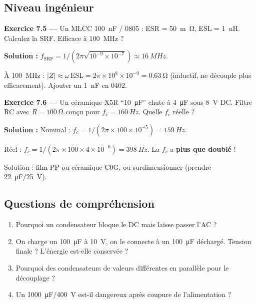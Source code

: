 \documentclass[12pt,a4paper,twoside]{book}
\begin{document}
\subsection*{Niveau ingénieur}

\textbf{Exercice 7.5 ---} Un MLCC \SI{100}{nF} / 0805 : ESR = \SI{50}{m\ohm}, ESL = \SI{1}{nH}. Calculez la SRF. Efficace à \SI{100}{MHz} ?

\begin{pratique}
\textbf{Solution :} $f_{\text{SRF}} = 1/(2\pi\sqrt{10^{-9}\times10^{-7}}) \approx \SI{16}{MHz}$.

À \SI{100}{MHz} : $|Z| \approx \omega\,\text{ESL} = 2\pi\times10^8\times10^{-9} = \SI{0.63}{\ohm}$ (inductif, ne découple plus efficacement). Ajouter un \SI{1}{nF} en 0402.
\end{pratique}

\textbf{Exercice 7.6 ---} Un céramique X5R ``\SI{10}{\micro F}'' chute à \SI{4}{\micro F} sous \SI{8}{V} DC. Filtre RC avec $R = \SI{100}{\ohm}$ conçu pour $f_c = \SI{160}{Hz}$. Quelle $f_c$ réelle ?

\begin{pratique}
\textbf{Solution :} Nominal : $f_c = 1/(2\pi\times100\times10^{-5}) = \SI{159}{Hz}$.

Réel : $f_c = 1/(2\pi\times100\times4\times10^{-6}) = \SI{398}{Hz}$. La $f_c$ a \textbf{plus que doublé} !

Solution : film PP ou céramique C0G, ou surdimensionner (prendre \SI{22}{\micro F}/\SI{25}{V}).
\end{pratique}

\subsection*{Questions de compréhension}

\begin{enumerate}[nosep]
\item Pourquoi un condensateur bloque le DC mais laisse passer l'AC ?
\item On charge un \SI{100}{\micro F} à \SI{10}{V}, on le connecte à un \SI{100}{\micro F} déchargé. Tension finale ? L'énergie est-elle conservée ?
\item Pourquoi des condensateurs de valeurs différentes en parallèle pour le découplage ?
\item Un \SI{1000}{\micro F}/\SI{400}{V} est-il dangereux après coupure de l'alimentation ?
\end{enumerate}
\end{document}
